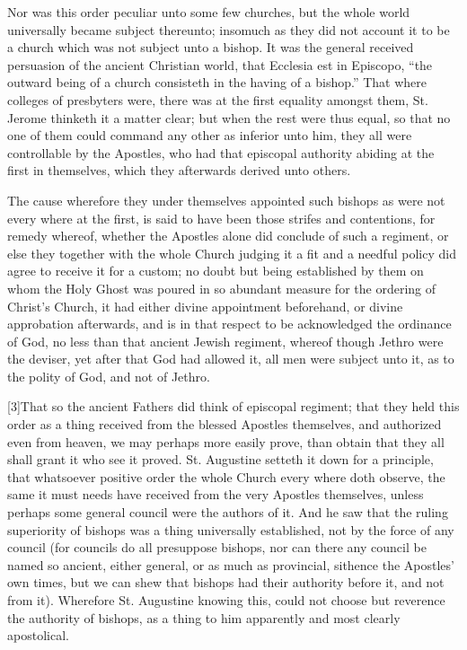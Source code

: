 Nor was this order peculiar unto some few churches, but the whole world universally became subject thereunto; insomuch as they did not account it to be a church which was not subject unto a bishop. It was the general received persuasion of the ancient Christian world, that Ecclesia est in Episcopo, “the outward being of a church consisteth in the having of a bishop.” That where colleges of presbyters were, there was at the first equality amongst them, St. Jerome  thinketh it a matter clear;
 but when the rest were thus equal, so that no one of them could command any other as inferior unto him, they all were controllable by the Apostles, who had that episcopal authority abiding at the first in themselves, which they afterwards derived unto others.

The cause wherefore they under themselves appointed such bishops as were not every where at the first, is said to have been those strifes and contentions, for remedy whereof, whether the Apostles alone did conclude of such a regiment, or else they together with the whole Church judging it a fit and a needful policy did agree to receive it for a custom; no doubt but being established by them on whom the Holy Ghost was poured in so abundant measure for the ordering of Christ’s Church, it had either divine appointment beforehand, or divine approbation afterwards, and is in that respect to be acknowledged the ordinance of God, no less than that ancient Jewish regiment, whereof though Jethro were the deviser, yet after that God had allowed it, all men were subject unto it, as to the polity of God, and not of Jethro.

[3]That so the ancient Fathers did think of episcopal regiment; that they held this order as a thing received from the blessed Apostles themselves, and authorized even from heaven, we may perhaps more easily prove, than obtain that they all shall grant it who see it proved. St. Augustine setteth it down for a principle, that whatsoever positive order the whole Church every where doth observe, the same it must needs have received from the very Apostles themselves, unless perhaps some general council were the authors of it. And he saw that the ruling superiority of bishops was a thing universally established, not by the force of any council (for councils do all presuppose bishops, nor can there any council be named so ancient, either general, or as much as provincial, sithence the Apostles’ own times, but we can shew that bishops had their authority before it, and not from it). Wherefore St. Augustine knowing this, could not choose but reverence the  authority of bishops, as a thing to him apparently and most clearly apostolical.


